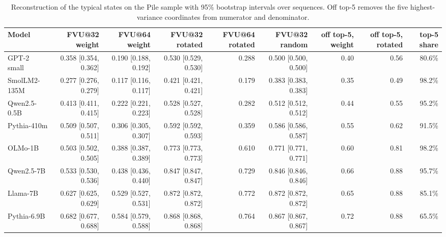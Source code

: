 \begin{table}[H]\centering\scriptsize
\caption{Reconstruction of the typical states on the Pile sample with 95\% bootstrap intervals over sequences. Off top-5 removes the five highest-variance coordinates from numerator and denominator.}\label{app:ci-recon-pile}
\begin{adjustbox}{max width=\linewidth}
\begin{tabular}{lrrrrrrrr}\toprule
Model & FVU@32 weight & FVU@64 weight & FVU@32 rotated & FVU@64 rotated & FVU@32 random & off top-5, weight & off top-5, rotated & top-5 share \\ \midrule
GPT-2 small & 0.358 [0.354, 0.362] & 0.190 [0.188, 0.192] & 0.530 [0.529, 0.530] & 0.288 & 0.500 [0.500, 0.500] & 0.40 & 0.56 & 80.6\% \\
SmolLM2-135M & 0.277 [0.276, 0.279] & 0.117 [0.116, 0.117] & 0.421 [0.421, 0.421] & 0.179 & 0.383 [0.383, 0.383] & 0.35 & 0.49 & 98.2\% \\
Qwen2.5-0.5B & 0.413 [0.411, 0.415] & 0.222 [0.221, 0.223] & 0.528 [0.527, 0.528] & 0.282 & 0.512 [0.512, 0.512] & 0.44 & 0.55 & 95.2\% \\
Pythia-410m & 0.509 [0.507, 0.511] & 0.306 [0.305, 0.307] & 0.592 [0.592, 0.593] & 0.359 & 0.586 [0.586, 0.587] & 0.55 & 0.62 & 91.5\% \\
OLMo-1B & 0.503 [0.502, 0.505] & 0.388 [0.387, 0.389] & 0.773 [0.773, 0.773] & 0.610 & 0.771 [0.771, 0.771] & 0.60 & 0.81 & 98.2\% \\
Qwen2.5-7B & 0.533 [0.530, 0.536] & 0.438 [0.436, 0.440] & 0.847 [0.847, 0.847] & 0.729 & 0.846 [0.846, 0.846] & 0.66 & 0.88 & 95.7\% \\
Llama-7B & 0.627 [0.625, 0.629] & 0.529 [0.527, 0.531] & 0.872 [0.872, 0.872] & 0.772 & 0.872 [0.872, 0.872] & 0.65 & 0.88 & 85.1\% \\
Pythia-6.9B & 0.682 [0.677, 0.688] & 0.584 [0.579, 0.588] & 0.868 [0.868, 0.868] & 0.764 & 0.867 [0.867, 0.867] & 0.72 & 0.88 & 65.5\% \\
\bottomrule\end{tabular}\end{adjustbox}
\end{table}
